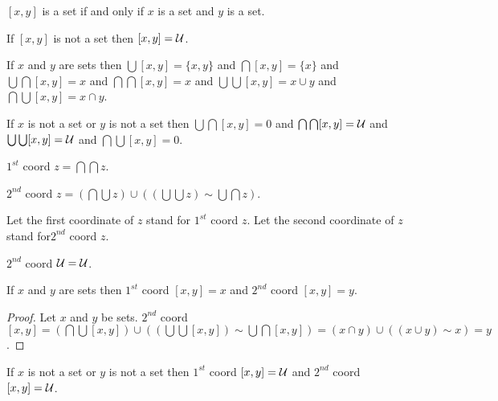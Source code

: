 \documentclass[a4paper,draft]{amsproc}
\begin{document}
\begin{forthel}
\begin{theorem}
$[x,y]$ is a set if and only if $x$ is a set and $y$ is a set.
\end{theorem}

\begin{theorem}
If $[x,y]$ is not a set then $[x,y] = \cal{U}$.
\end{theorem}

\begin{theorem}
If $x$ and $y$ are sets then 
  $\bigcup [x,y] = \{x,y\}$ and
  $\bigcap [x,y] = \{x\}$ and
  $\bigcup \bigcap [x,y] = x$ and
  $\bigcap \bigcap [x,y] = x$ and
  $\bigcup \bigcup [x,y] = x \cup y$ and
  $\bigcap \bigcup [x,y] = x \cap y$.
\end{theorem}

\begin{theorem}
If $x$ is not a set or $y$ is not a set then
  $\bigcup \bigcap [x,y] = 0$ and
  $\bigcap \bigcap [x,y] = \cal{U}$ and
  $\bigcup \bigcup [x,y] = \cal{U}$ and
  $\bigcap \bigcup [x,y] = 0$.
\end{theorem}

\begin{definition} $1^{st}$ coord $z = \bigcap \bigcap z$.\end{definition}

\begin{definition} $2^{nd}$ coord $z = (\bigcap \bigcup z) \cup 
((\bigcup \bigcup z) \sim \bigcup \bigcap z)$.\end{definition} 
Let the first coordinate of $z$ stand for $1^{st}$ coord $z$.
Let the second coordinate of $z$ stand for$2^{nd}$ coord $z$.

\begin{theorem}
$2^{nd}$ coord $\cal{U} = \cal{U}$.
\end{theorem}

\begin{theorem}
If $x$ and $y$ are sets 
then $1^{st}$ coord $[x,y] = x$ and $2^{nd}$ coord $[x,y] = y$.
\end{theorem}
\begin{proof}
Let $x$ and $y$ be sets.
$2^{nd}$ coord $[x,y] = (\bigcap \bigcup [x,y]) \cup 
((\bigcup \bigcup [x,y]) \sim \bigcup \bigcap [x,y])
= (x \cap y) \cup ((x \cup y) \sim x)
= y$.
\end{proof}

\begin{theorem}
If $x$ is not a set or $y$ is not a set then
$1^{st}$ coord $[x,y] = \cal{U}$ and 
$2^{nd}$ coord $[x,y] = \cal{U}$.
\end{theorem}


\end{forthel}
\end{document}
